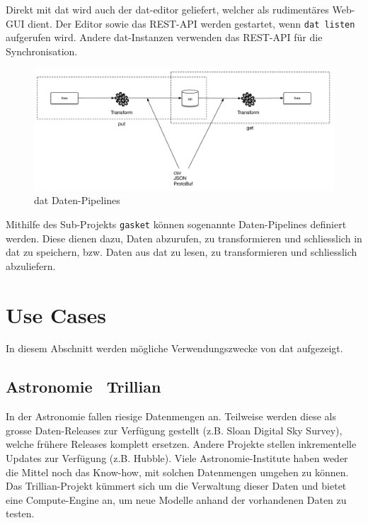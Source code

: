 Direkt mit dat wird auch der dat-editor geliefert, welcher als rudimentäres Web-GUI dient. Der Editor sowie das REST-API werden gestartet, wenn \texttt{dat listen} aufgerufen wird. Andere dat-Instanzen verwenden das REST-API für die Synchronisation.

\begin{figure}[H]
  \centering
  \includegraphics[width=\linewidth,clip]{fig/dat-pipeline}
  \caption{dat Daten-Pipelines}
  \label{fig:dat-architecture-pipeline}
\end{figure}

Mithilfe des Sub-Projekts \texttt{gasket} können sogenannte Daten-Pipelines definiert werden. Diese dienen dazu, Daten abzurufen, zu transformieren und schliesslich in dat zu speichern, bzw. Daten aus dat zu lesen, zu transformieren und schliesslich abzuliefern.

\section{Use Cases}
In diesem Abschnitt werden mögliche Verwendungszwecke von \gls{dat} aufgezeigt.

\subsection{Astronomie \textendash\ Trillian} 
In der Astronomie fallen riesige Datenmengen an. Teilweise werden diese als grosse Daten-Releases zur Verfügung gestellt (z.B. Sloan Digital Sky Survey), welche frühere Releases komplett ersetzen. Andere Projekte stellen inkrementelle Updates zur Verfügung (z.B. Hubble). Viele Astronomie-Institute haben weder die Mittel noch das Know-how, mit solchen Datenmengen umgehen zu können. Das Trillian-Projekt kümmert sich um die Verwaltung dieser Daten und bietet eine Compute-Engine an, um neue Modelle anhand der vorhandenen Daten zu testen.

